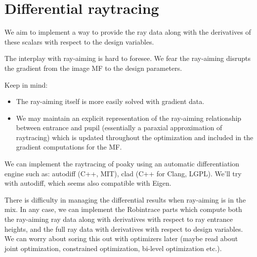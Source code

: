 \section{Differential raytracing}
We aim to implement a way to provide the ray data along with the derivatives of
these scalars with respect to the design variables.

The interplay with ray-aiming is hard to foresee. We fear the ray-aiming
disrupts the gradient from the image MF to the design parameters.

Keep in mind:

\begin{itemize}
\item The ray-aiming itself is more easily solved with gradient data.
\item We may maintain an explicit representation of the ray-aiming relationship
between entrance and pupil (essentially a paraxial approximation of raytracing)
which is updated throughout the optimization and included in the gradient
computations for the MF.
\end{itemize}

We can implement the raytracing of poaky using an automatic differentiation
engine such as: autodiff (C++, MIT), clad (C++ for Clang, LGPL). We'll try
with autodiff, which seems also compatible with Eigen.

There is difficulty in managing the differential results when ray-aiming is
in the mix. In any case, we can implement the Robintrace parts which
compute both the ray-aiming ray data along with derivatives with respect
to ray entrance heights, and the full ray data with derivatives with respect
to design variables. We can worry about soring this out with optimizers later
(maybe read about joint optimization, constrained optimization, bi-level
optimization etc.).
